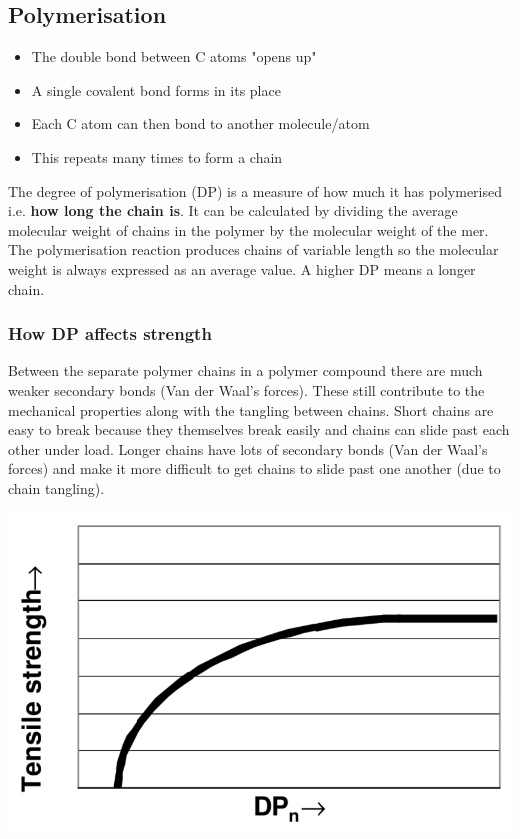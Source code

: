 \documentclass[12pt]{article}
\begin{document}
\subsection{Polymerisation}
\begin{itemize}
  \item The double bond between C atoms "opens up"
  \item A single covalent bond forms in its place 
  \item Each C atom can then bond to another molecule/atom
  \item This repeats many times to form a chain
\end{itemize}

The degree of polymerisation (DP) is a measure of how much it has polymerised i.e. \textbf{how long the chain is}.
It can be calculated by dividing the average molecular weight of chains in the polymer by the molecular weight of the mer.
The polymerisation reaction produces chains of variable length so the molecular weight is always expressed as an average value.
A higher DP means a longer chain.

\subsubsection{How DP affects strength}
Between the separate polymer chains in a polymer compound there are much weaker secondary bonds (Van der Waal's forces). 
These still contribute to the mechanical properties along with the tangling between chains.
Short chains are easy to break because they themselves break easily and chains can slide past each other under load.
Longer chains have lots of secondary bonds (Van der Waal's forces) and make it more difficult to get chains to slide past one another (due to chain tangling).

\includegraphics[scale=0.3]{strengthagainstdp}
\end{document}
